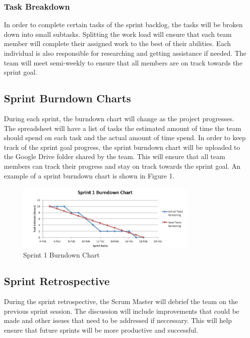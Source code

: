 \subsubsection{Task Breakdown}
In order to complete certain tasks of the sprint backlog, the tasks will be broken down into small subtasks. Splitting the work load will ensure that each team member will complete their assigned work to the best of their abilities. Each individual is also responsible for researching and getting assistance if needed. The team will meet semi-weekly to ensure that all members are on track towards the sprint goal.

\subsection{Sprint Burndown Charts}
During each sprint, the burndown chart will change as the project progresses. The spreadsheet will have a list of tasks the estimated amount of time the team should spend on each task and the actual amount of time spend. In order to keep track of the sprint goal progress, the sprint burndown chart will be uploaded to the Google Drive folder shared by the team. This will ensure that all team members can track their progress and stay on track towards the sprint goal. An example of a sprint burndown chart is shown in Figure 1.

\begin{figure}[h!]
    \centering
    \includegraphics[width=0.80\textwidth]{images/chart}
    \caption{Sprint 1 Burndown Chart}
\end{figure}

\subsection{Sprint Retrospective}
During the sprint retrospective, the Scrum Master will debrief the team on the previous sprint session. The discussion will include improvements that could be made and other issues that need to be addressed if neccessary. This will help ensure that future sprints will be more productive and successful.

